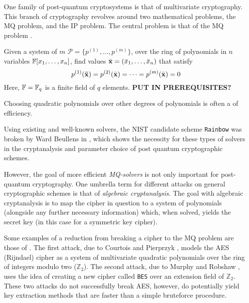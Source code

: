 One family of post-quantum cryptosystems is that of multivariate cryptography. This branch of cryptography revolves around two mathematical problems, the MQ problem, and the IP problem. The central problem is that of the MQ problem \cite{Ding2020}.

\begin{defn}\label{sec1:def:mq}
Given a system of $m$  $\mathcal{P} = \{p^{(1)}, \dots, p^{(m)}\}$, over the ring of polynomials in $n$ variables $\mathbb{F}[x_1, \dots, x_n]$, find values $\Bar{\mathbf{x}} = (\Bar{x}_1, \dots, \Bar{x}_n)$ that satisfy
$$
    p^{(1)}(\mathbf{\Bar{\mathbf{x}}}) =  p^{(2)}(\Bar{\mathbf{x}}) = \dots = p^{(m)}(\Bar{\mathbf{x}}) = 0 
$$
Here, $\mathbb{F} = \mathbb{F}_q$ is a finite field of $q$ elements. \textbf{PUT IN PREREQUISITES?} 
\end{defn}

Choosing quadratic polynomials over other degrees of polynomials is often a  of efficiency.


 Using existing and well-known solvers, the NIST candidate scheme \texttt{Rainbow} was broken by Ward Beullens in \cite{cryptoeprint:2022/214}, which shows the necessity for these types of solvers in the cryptanalysis and parameter choice of post quantum cryptographic schemes.

However, the goal of more efficient \textit{MQ-solvers} is not only important for post-quantum cryptography. One umbrella term for different attacks on general cryptographic schemes is that of \textit{algebraic cryptanalysis}. The goal with algebraic cryptanalysis is to map the cipher in question to a system of polynomials (alongside any further necessary information) which, when solved, yields the secret key (in this case for a symmetric key cipher).

Some examples of a reduction from breaking a cipher to the MQ problem are those of \cite{nover2005algebraic}. The first attack, due to Courtois and Pierprzyk \cite{courtois2002cryptanalysis}, models the AES (Rijndael) cipher as a system of multivariate quadratic polynomials over the ring of integers modulo two ($\mathbb{Z}_2$). The second attack, due to Murphy and Robshaw \cite{10.1007/3-540-45708-9_1}, uses the idea of creating a new cipher called \texttt{BES} over an extension field of $\mathbb{Z}_2$. These two attacks do not successfully break AES, however, do potentially yield key extraction methods that are faster than a simple bruteforce procedure.

